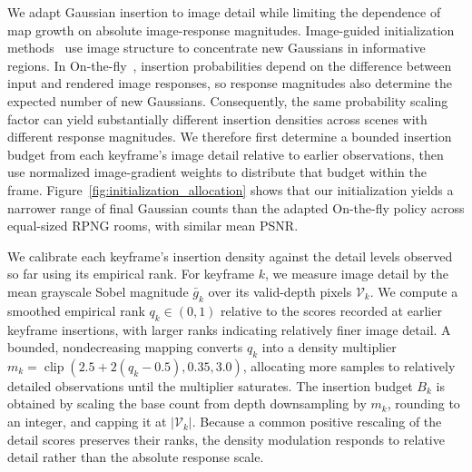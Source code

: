 We adapt Gaussian insertion to image detail while limiting the dependence of map growth on absolute image-response magnitudes.
Image-guided initialization methods~\cite{meuleman2025onthefly,thomas2026gausslite} use image structure to concentrate new Gaussians in informative regions.
In On-the-fly~\cite{meuleman2025onthefly}, insertion probabilities depend on the difference between input and rendered image responses, so response magnitudes also determine the expected number of new Gaussians.
Consequently, the same probability scaling factor can yield substantially different insertion densities across scenes with different response magnitudes.
We therefore first determine a bounded insertion budget from each keyframe's image detail relative to earlier observations, then use normalized image-gradient weights to distribute that budget within the frame.
Figure~\ref{fig:initialization_allocation} shows that our initialization yields a narrower range of final Gaussian counts than the adapted On-the-fly policy across equal-sized RPNG rooms, with similar mean PSNR.

We calibrate each keyframe's insertion density against the detail levels observed so far using its empirical rank.
For keyframe $k$, we measure image detail by the mean grayscale Sobel magnitude $\bar g_k$ over its valid-depth pixels $\mathcal V_k$.
We compute a smoothed empirical rank $q_k\in(0,1)$ relative to the scores recorded at earlier keyframe insertions, with larger ranks indicating relatively finer image detail.
A bounded, nondecreasing mapping converts $q_k$ into a density multiplier $m_k=\operatorname{clip}(2.5+2(q_k-0.5),0.35,3.0)$, allocating more samples to relatively detailed observations until the multiplier saturates.
The insertion budget $B_k$ is obtained by scaling the base count from depth downsampling by $m_k$, rounding to an integer, and capping it at $|\mathcal V_k|$.
Because a common positive rescaling of the detail scores preserves their ranks, the density modulation responds to relative detail rather than the absolute response scale.


